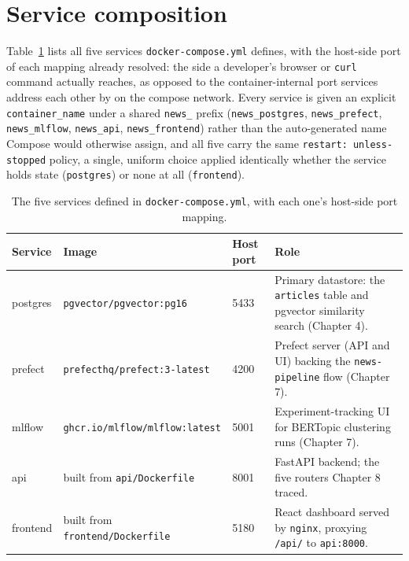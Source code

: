 \section{Service composition}
\label{sec:service-composition}
\begin{sloppypar}
Table~\ref{tab:services} lists all five services \texttt{docker-compose.yml} defines, with the host-side port of each mapping already resolved: the side a developer's browser or \texttt{curl} command actually reaches, as opposed to the container-internal port services address each other by on the compose network. Every service is given an explicit \texttt{container\_name} under a shared \texttt{news\_} prefix (\texttt{news\_postgres}, \texttt{news\_prefect}, \texttt{news\_mlflow}, \texttt{news\_api}, \texttt{news\_frontend}) rather than the auto-generated name Compose would otherwise assign, and all five carry the same \texttt{restart: unless-stopped} policy, a single, uniform choice applied identically whether the service holds state (\texttt{postgres}) or none at all (\texttt{frontend}).
\end{sloppypar}

\begin{table}[H]
\centering
\begin{tabular}{|p{1.7cm}|p{4.6cm}|p{1.7cm}|p{5.9cm}|}
\hline
\textbf{Service} & \textbf{Image} & \textbf{Host port} & \textbf{Role} \\
\hline
postgres & \texttt{pgvector/\allowbreak pgvector:pg16} & 5433 & Primary datastore: the \texttt{articles} table and pgvector similarity search (Chapter 4). \\
\hline
prefect & \texttt{prefecthq/\allowbreak prefect:3-latest} & 4200 & Prefect server (API and UI) backing the \texttt{news-pipeline} flow (Chapter 7). \\
\hline
mlflow & \texttt{ghcr.io/\allowbreak mlflow/\allowbreak mlflow:latest} & 5001 & Experiment-tracking UI for BERTopic clustering runs (Chapter 7). \\
\hline
api & built from \texttt{api/\allowbreak Dockerfile} & 8001 & FastAPI backend; the five routers Chapter 8 traced. \\
\hline
frontend & built from \texttt{frontend/\allowbreak Dockerfile} & 5180 & React dashboard served by \texttt{nginx}, proxying \texttt{/api/} to \texttt{api:8000}. \\
\hline
\end{tabular}
\caption{The five services defined in \texttt{docker-compose.yml}, with each one's host-side port mapping.}
\label{tab:services}
\end{table}

